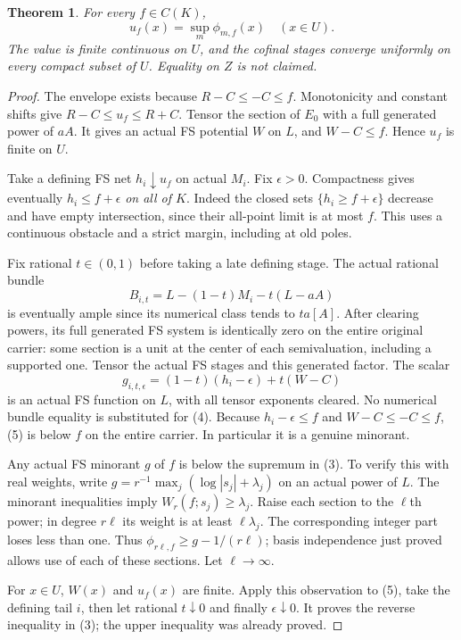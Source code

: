 \documentclass[11pt]{article}
\newtheorem{theorem}{Theorem}
\begin{document}
\begin{theorem}\label{density}
For every $f\in C(K)$,
\[
                  u_f(x)=\sup_m\phi_{m,f}(x)
                    \quad(x\in U).                    \tag{3}
\]
The value is finite continuous on $U$, and the cofinal stages converge
uniformly on every compact subset of $U$. Equality on $Z$ is not claimed.
\end{theorem}
\begin{proof}
The envelope exists because $R-C\leq-C\leq f$. Monotonicity and
constant shifts give $R-C\leq u_f\leq R+C$.
Tensor the section of $E_0$ with a full generated power of $aA$.
It gives an actual FS potential $W$ on $L$, and $W-C\leq f$.
Hence $u_f$ is finite on $U$.

Take a defining FS net $h_i\downarrow u_f$ on actual $M_i$.
Fix $\epsilon>0$. Compactness gives eventually $h_i\leq f+\epsilon$
\emph{on all of $K$}. Indeed the closed sets
$\{h_i\geq f+\epsilon\}$ decrease and have empty intersection,
since their all-point limit is at most $f$. This uses a continuous
obstacle and a strict margin, including at old poles.

Fix rational $t\in(0,1)$ before taking a late defining stage. The
actual rational bundle
\[
                B_{i,t}=L-(1-t)M_i-t(L-aA)               \tag{4}
\]
is eventually ample since its numerical class tends to $ta[A]$.
After clearing powers, its full generated FS system is identically
zero on the entire original carrier: some section is a unit at the
center of each semivaluation, including a supported one.
Tensor the actual FS stages and this generated factor. The scalar
\[
                g_{i,t,\epsilon}
                    =(1-t)(h_i-\epsilon)+t(W-C)          \tag{5}
\]
is an actual FS function on $L$, with all tensor exponents cleared.
No numerical bundle equality is substituted for (4). Because
$h_i-\epsilon\leq f$ and $W-C\leq-C\leq f$, (5) is below $f$
on the entire carrier. In particular it is a genuine minorant.

Any actual FS minorant $g$ of $f$ is below the supremum in (3).
To verify this with real weights, write
$g=r^{-1}\max_j(\log|s_j|+\lambda_j)$ on an actual power of $L$.
The minorant inequalities imply $W_r(f;s_j)\geq\lambda_j$.
Raise each section to the $\ell$th power; in degree $r\ell$ its
weight is at least $\ell\lambda_j$. The corresponding integer part
loses less than one. Thus
$\phi_{r\ell,f}\geq g-1/(r\ell)$; basis independence just proved
allows use of each of these sections. Let $\ell\to\infty$.

For $x\in U$, $W(x)$ and $u_f(x)$ are finite. Apply this observation
to (5), take the defining tail $i$, then let rational $t\downarrow0$
and finally $\epsilon\downarrow0$. It proves the reverse inequality
in (3); the upper inequality was already proved.


\end{proof}
\end{document}
